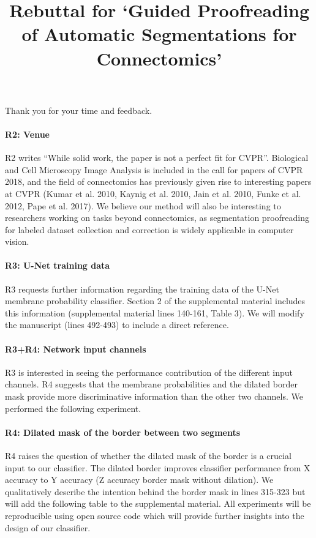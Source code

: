 \documentclass[10pt,twocolumn,letterpaper]{article}
\begin{document}
\title{Rebuttal for `Guided Proofreading of Automatic Segmentations for Connectomics'}  %

\maketitle
\thispagestyle{empty}

Thank you for your time and feedback.

\paragraph{R2: Venue} R2 writes ``While solid work, the paper is not a perfect fit for CVPR''. Biological and Cell Microscopy Image Analysis is included in the call for papers of CVPR 2018, and the field of connectomics has previously given rise to interesting papers at CVPR (Kumar et al. 2010, Kaynig et al. 2010, Jain et al. 2010, Funke et al. 2012, Pape et al. 2017). We believe our method will also be interesting to researchers working on tasks beyond connectomics, as segmentation proofreading for labeled dataset collection and correction is widely applicable in computer vision.

\paragraph{R3: U-Net training data} R3 requests further information regarding the training data of the U-Net membrane probability classifier. Section 2 of the supplemental material includes this information (supplemental material lines 140-161, Table 3). We will modify the manuscript (lines 492-493) to include a direct reference.

\paragraph{R3+R4: Network input channels} R3 is interested in seeing the performance contribution of the different input channels. R4 suggests that the membrane probabilities and the dilated border mask provide more discriminative information than the other two channels. We performed the following experiment.

\paragraph{R4: Dilated mask of the border between two segments} R4 raises the question of whether the dilated mask of the border is a crucial input to our classifier. The dilated border improves classifier performance from X accuracy to Y accuracy (Z accuracy border mask without dilation). We qualitatively describe the intention behind the border mask in lines 315-323 but will add the following table to the supplemental material.
	All experiments will be reproducible using open source code which will provide further insights into the design of our classifier.
\end{document}
